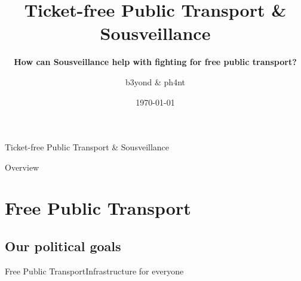 \documentclass[10pt]{beamer}
\title[] %
{ %
      \textbf{Ticket-free Public Transport \& Sousveillance}
}
\subtitle[Ticket-free Public Transport \& Sousveillance]
{
      \textbf{How can Sousveillance help with fighting for free public transport?}
}
\author[b3yond]
{      b3yond \& ph4nt \\
      {}
}
\institute[]
{
      links\_tech
  
}
\date{\today}
\begin{document}

{\1%



\begin{frame}{Ticket-free Public Transport \& Sousveillance}

\maketitle
\tableofcontents

\end{frame}

\begin{frame}{Overview}{}

\tableofcontents

\end{frame}

\section{Free Public Transport}
\subsection{Our political goals}
\begin{frame}{Free Public Transport}{Infrastructure for everyone}


\end{frame}}
\end{document}
